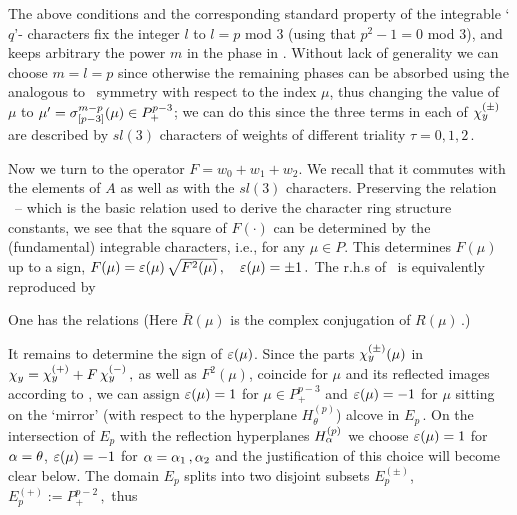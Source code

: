 The above conditions  and the corresponding standard property
 of the integrable `$q$'- characters
%
\eqn{}
%
fix the integer $l$ to $l=p$ mod $3$ (using that $p^2-1=0$ mod
$3$), and keeps arbitrary the power $m$ in the phase in \Vd.
Without lack of generality we can choose $m=l=p$ since otherwise
the remaining phases can be absorbed using the analogous to
\ssym\  symmetry  with respect to the index $\mu$,
%
\eqn{}
%
thus changing the value of $\mu$ to
$\mu'=\sigma_{[p-3]}^{m-p}(\mu)
\in P_+^{p-3}$; we can do this since the three terms in each of
$\chi_y^{(\pm)}$
are described by $sl(3)$ characters of weights of different triality
$\tau=0,1,2\,.$ 

\medskip
Now we turn to the operator $F=w_0+w_1+w_2$. We recall that it
commutes with the elements of $A$ as well as with the $sl(3)$
characters. Preserving the relation \basr\ -- which is the basic
relation used to derive the character ring structure constants,
we see that the square of $F(\cdot)$ can be determined by the
(fundamental) integrable characters, i.e.,
%
\eqn{}
%
for any $\mu\in P$. This determines $F(\mu)$ up to a sign,
$F(\mu)= \varepsilon(\mu)\, \sqrt{F^2(\mu)}\,, \quad \varepsilon(\mu)=\pm 1\,.$
The r.h.s of \sqf\ is equivalently reproduced  by  
%
\eqn{}
%

One has the relations 
%
\eqn{}
%
%
\eqn{}
%
(Here  $\bar{R}(\mu)$ is the complex conjugation of $R(\mu)\,.$)


It remains to determine the sign of $\varepsilon(\mu)$.  
Since the  parts $\chi_y^{(\pm)}(\mu)$ in $\chi_y=\chi_y^{(+)} 
+F\, \chi_y^{(-)}\,,$   as well as
$F^2(\mu)$, coincide  for $\mu$ and its reflected images
according to \VIa, we can assign $\varepsilon(\mu)=1$ for $\mu\in
P_+^{p-3}$ and $\varepsilon(\mu)=-1$ for $\mu$ sitting on the `mirror'
(with respect to the hyperplane $H_{\theta}^{(p)}$) alcove in
$E_p\,.$   On the intersection of $E_p$ with the
reflection hyperplanes $H_{\alpha}^{(p)}$ we choose $\varepsilon(\mu)=1$ for
$\alpha=\theta$, $\varepsilon(\mu)=-1$ for $\alpha=\alpha_1\,, \alpha_2$ and the
justification of this choice will become clear below. 
The domain $E_p$ splits into two disjoint subsets $E_p^{(\pm)}$,
$E_p^{(+)} :=P_+^{p-2}\,,$ thus 
%
\eqn{}
%

